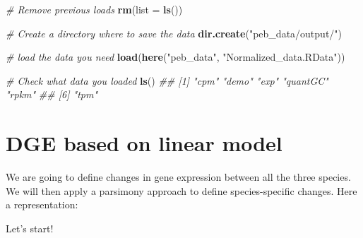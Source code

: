 \documentclass[]{book}
\newenvironment{Shaded}{\begin{snugshade}}{\end{snugshade}}
\newcommand{\CommentTok}[1]{\textcolor[rgb]{0.56,0.35,0.01}{\textit{#1}}}
\newcommand{\DataTypeTok}[1]{\textcolor[rgb]{0.13,0.29,0.53}{#1}}
\newcommand{\KeywordTok}[1]{\textcolor[rgb]{0.13,0.29,0.53}{\textbf{#1}}}
\newcommand{\NormalTok}[1]{#1}
\newcommand{\StringTok}[1]{\textcolor[rgb]{0.31,0.60,0.02}{#1}}
\begin{document}
\begin{Shaded}
\begin{Highlighting}[]
\CommentTok{# Remove previous loads}
\KeywordTok{rm}\NormalTok{(}\DataTypeTok{list =} \KeywordTok{ls}\NormalTok{())}

\CommentTok{# Create a directory where to save the data}
\KeywordTok{dir.create}\NormalTok{(}\StringTok{"peb_data/output/"}\NormalTok{)}

\CommentTok{# load the data you need}
\KeywordTok{load}\NormalTok{(}\KeywordTok{here}\NormalTok{(}\StringTok{"peb_data"}\NormalTok{, }\StringTok{"Normalized_data.RData"}\NormalTok{))}

\CommentTok{# Check what data you loaded}
\KeywordTok{ls}\NormalTok{()}
\CommentTok{## [1] "cpm"     "demo"    "exp"     "quantGC" "rpkm"   }
\CommentTok{## [6] "tpm"}
\end{Highlighting}
\end{Shaded}

\hypertarget{dge-based-on-linear-model}{%
\section{DGE based on linear model}\label{dge-based-on-linear-model}}

We are going to define changes in gene expression between all the three species.
We will then apply a parsimony approach to define species-specific changes.
Here a representation:

Let's start!
\end{document}
